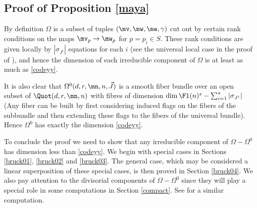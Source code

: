 \subsection{Proof of Proposition \ref{maya}}
 By definition $\Omega$ is a subset of  tuples $(\mv,\mw,\me,\gamma)$ cut out by certain rank conditions on the maps $\mv_p\to \mw_p$ for $p=p_i\in S$. These rank conditions are given locally by $ |\sigma_{J^i}|$ equations for each $i$ (see the universal local case in the proof of \cite[Theorem 14.3]{FInt}), and hence the dimension of each irreducible component of $\Omega$ is at least as much as \eqref{codeyy}.

 It is also clear that $\Omega^0(d,r,\mn,n,\vec{J})$ is a smooth fiber bundle over an open subset of $\Quot(d,r,\mn,n)$ with fibres of dimension  $\dim \Fl(n)^s -\sum_{i=1}^s |\sigma_{J^i}|$ (Any fiber can be built by first considering induced flags on the  fibers of the subbundle and then extending these flags to the fibers of the universal bundle). Hence $\Omega^0$ has exactly the dimension \eqref{codeyy}.

 To conclude the proof we need to show that any irreducible component of $\Omega-\Omega^0$ has dimension less than \eqref{codeyy}.  We begin with  special cases in Sections \ref{bruck01}, \ref{bruck02} and \ref{bruck03}. The general case, which may be considered a linear superposition of these special cases,  is then proved in Section \ref{bruck04}. We also pay attention to  the divisorial components of  $\Omega-\Omega^0$ since they will play a special role in some computations in Section \ref{compact}.
 See \cite[Section 12.1]{BGM} for a similar computation.

